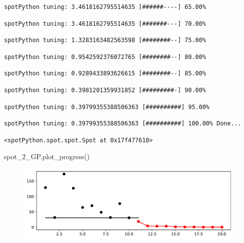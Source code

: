 \documentclass[
  letterpaper,
  DIV=11,
  numbers=noendperiod]{scrreprt}
\newenvironment{Shaded}{\begin{snugshade}}{\end{snugshade}}
\newcommand{\NormalTok}[1]{\textcolor[rgb]{0.00,0.23,0.31}{#1}}
\begin{document}
\begin{verbatim}
spotPython tuning: 3.4618162795514635 [######----] 65.00% 
\end{verbatim}

\begin{verbatim}
spotPython tuning: 3.4618162795514635 [#######---] 70.00% 
\end{verbatim}

\begin{verbatim}
spotPython tuning: 1.3283163482563598 [########--] 75.00% 
\end{verbatim}

\begin{verbatim}
spotPython tuning: 0.9542592376072765 [########--] 80.00% 
\end{verbatim}

\begin{verbatim}
spotPython tuning: 0.9289433893626615 [########--] 85.00% 
\end{verbatim}

\begin{verbatim}
spotPython tuning: 0.3981201359931852 [#########-] 90.00% 
\end{verbatim}

\begin{verbatim}
spotPython tuning: 0.39799355388506363 [##########] 95.00% 
\end{verbatim}

\begin{verbatim}
spotPython tuning: 0.39799355388506363 [##########] 100.00% Done...
\end{verbatim}

\begin{verbatim}
<spotPython.spot.spot.Spot at 0x17f477610>
\end{verbatim}

\begin{Shaded}
\begin{Highlighting}[]
\NormalTok{spot\_2\_GP.plot\_progress()}
\end{Highlighting}
\end{Shaded}

\begin{figure}[H]

{\centering \includegraphics{04_spot_sklearn_surrogate_files/figure-pdf/cell-18-output-1.pdf}

}

\end{figure}
\end{document}
